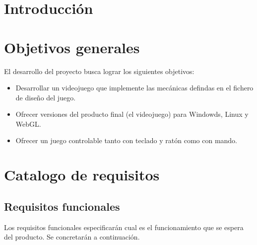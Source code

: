 
\section{Introducción}

\section{Objetivos generales}
El desarrollo del proyecto busca lograr los siguientes objetivos:
\begin{itemize}
\item
Desarrollar un videojuego que implemente las mecánicas defindas en el fichero de diseño del juego.

\item
Ofrecer versiones del producto final (el videojuego) para Windowds, Linux y WebGL.

\item
Ofrecer un juego controlable tanto con teclado y ratón como con mando.
\end{itemize}

\section{Catalogo de requisitos}
\subsection{Requisitos funcionales}
Los requisitos funcionales especificarán cual es el funcionamiento que se espera del producto. Se concretarán a continuación.

